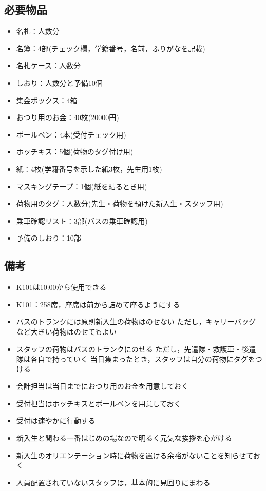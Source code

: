 


\subsection{必要物品}
\begin{itemize}
\item 名札：人数分
\item 名簿：4部(チェック欄，学籍番号，名前，ふりがなを記載)
\item 名札ケース：人数分
\item しおり：人数分と予備10個
\item 集金ボックス：4箱
\item おつり用のお金：40枚(20000円)
\item ボールペン：4本(受付チェック用)
\item ホッチキス：5個(荷物のタグ付け用)
\item 紙：4枚(学籍番号を示した紙3枚，先生用1枚)
\item マスキングテープ：1個(紙を貼るとき用)
\item 荷物用のタグ：人数分(先生・荷物を預けた新入生・スタッフ用)
\item 乗車確認リスト：3部(バスの乗車確認用)
\item 予備のしおり：10部
\end{itemize}


\subsection{備考}
\begin{itemize}
\item K101は10:00から使用できる
\item K101：258席，座席は前から詰めて座るようにする
\item バスのトランクには原則新入生の荷物はのせない ただし，キャリーバッグなど大きい荷物はのせてもよい
\item スタッフの荷物はバスのトランクにのせる ただし，先遣隊・救護車・後遣隊は各自で持っていく 当日集まったとき，スタッフは自分の荷物にタグをつける
\item 会計担当は当日までにおつり用のお金を用意しておく
\item 受付担当はホッチキスとボールペンを用意しておく
\item 受付は速やかに行動する
\item 新入生と関わる一番はじめの場なので明るく元気な挨拶を心がける
\item 新入生のオリエンテーション時に荷物を置ける余裕がないことを知らせておく
\item 人員配置されていないスタッフは，基本的に見回りにまわる
\end{itemize}



